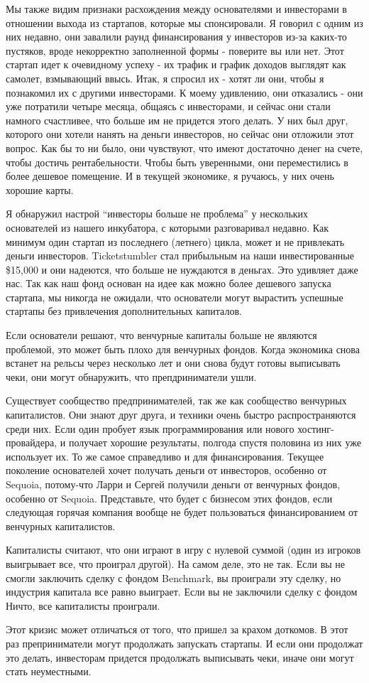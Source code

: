 \documentclass[ebook,12pt,oneside,openany]{memoir}
\begin{document}
Мы также видим признаки расхождения между основателями и инвесторами в
отношении выхода из стартапов, которые мы спонсировали. Я говорил с
одним из них недавно, они завалили раунд финансирования у инвесторов
из-за каких-то пустяков, вроде некорректно заполненной формы -
поверите вы или нет. Этот стартап идет к очевидному успеху - их трафик
и график доходов выглядят как самолет, взмывающий ввысь. Итак, я
спросил их - хотят ли они, чтобы я познакомил их с другими
инвесторами. К моему удивлению, они отказались - они уже потратили
четыре месяца, общаясь с инвесторами, и сейчас они стали намного
счастливее, что больше им не придется этого делать. У них был друг,
которого они хотели нанять на деньги инвесторов, но сейчас они
отложили этот вопрос. Как бы то ни было, они чувствуют, что имеют
достаточно денег на счете, чтобы достичь рентабельности. Чтобы быть
уверенными, они переместились в более дешевое помещение. И в текущей
экономике, я ручаюсь, у них очень хорошие карты.

Я обнаружил настрой “инвесторы больше не проблема” у нескольких
основателей из нашего инкубатора, с которыми разговаривал недавно. Как
минимум один стартап из последнего (летнего) цикла, может и не
привлекать деньги инвесторов. Ticketstumbler стал прибыльным на наши
инвестированные \$15,000 и они надеются, что больше не нуждаются в
деньгах. Это удивляет даже нас. Так как наш фонд основан на идее как
можно более дешевого запуска стартапа, мы никогда не ожидали, что
основатели могут вырастить успешные стартапы без привлечения
дополнительных капиталов.

Если основатели решают, что венчурные капиталы больше не являются
проблемой, это может быть плохо для венчурных фондов. Когда экономика
снова встанет на рельсы через несколько лет и они снова будут готовы
выписывать чеки, они могут обнаружить, что препдриниматели ушли.

Существует сообщество предпринимателей, так же как сообщество
венчурных капиталистов. Они знают друг друга, и техники очень быстро
распространяются среди них. Если один пробует язык программирования
или нового хостинг-провайдера, и получает хорошие результаты, полгода
спустя половина из них уже использует их. То же самое справедливо и
для финансирования. Текущее поколение основателей хочет получать
деньги от инвесторов, особенно от Sequoia, потому-что Ларри и Сергей
получили деньги от венчурных фондов, особенно от Sequoia. Представьте,
что будет с бизнесом этих фондов, если следующая горячая компания
вообще не будет пользоваться финансированием от венчурных
капиталистов.

Капиталисты считают, что они играют в игру с нулевой суммой (один из
игроков выигрывает все, что проиграл другой). На самом деле, это не
так. Если вы не смогли заключить сделку с фондом Benchmark, вы
проиграли эту сделку, но индустрия капитала все равно выиграет. Если
вы не заключили сделку с фондом Ничто, все капиталисты проиграли.

Этот кризис может отличаться от того, что пришел за крахом доткомов. В
этот раз преприниматели могут продолжать запускать стартапы. И если
они продолжат это делать, инвесторам придется продолжать выписывать
чеки, иначе они могут стать неуместными.
\end{document}
